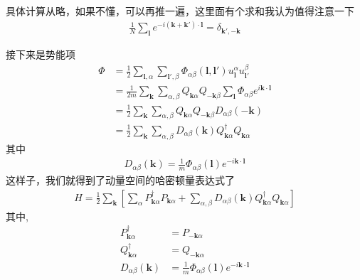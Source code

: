 具体计算从略，如果不懂，可以再推一遍，这里面有个求和我认为值得注意一下
\begin{equation}
    \begin{aligned} 
    \frac{1}{N} \sum_\mathbf{l} e^{-i(\mathbf{k} + \mathbf{k'})\cdot \mathbf{l}} = \delta_{\mathbf{k',-k} } 
    \end{aligned} 
\end{equation}
\par 接下来是势能项
\begin{equation}
    \begin{aligned} 
    \Phi &= \frac{1}{2} \sum_{\mathbf{l},\alpha }\sum_{\mathbf{l'},\beta}\Phi_{\alpha \beta} 
    (\mathbf{l,l'} )u_\mathbf{l}^\alpha u_\mathbf{l'}^\beta \\
    &= \frac{1}{2m} \sum_\mathbf{k}\sum_{\alpha,\beta} Q_{\mathbf{k}\alpha }Q_{\mathbf{-k}\beta }
    \sum_{\mathbf{l} }\Phi_{\alpha \beta} e^{i \mathbf{k\cdot l} }\\
    &= \frac{1}{2} \sum_\mathbf{k}\sum_{\alpha,\beta} Q_{\mathbf{k}\alpha }Q_{\mathbf{-k}\beta }
    D_{\alpha \beta} (-\mathbf{k} ) \\
    &= \frac{1}{2}\sum_\mathbf{k}\sum_{\alpha,\beta} D_{\alpha \beta} (\mathbf{k} ) Q_{\mathbf{k}\alpha }^\dagger
    Q_{\mathbf{k}\alpha }
    \end{aligned} 
\end{equation}
其中 
\begin{equation}
    \begin{aligned} 
        D_{\alpha \beta} (\mathbf{k} ) = \frac{1}{m}\Phi_{\alpha \beta} (\mathbf{l} )e^{-i \mathbf{k\cdot l} }
    \end{aligned} 
\end{equation}
这样子，我们就得到了动量空间的哈密顿量表达式了
\begin{equation}
    \begin{aligned} 
    H = \frac{1}{2}\sum_\mathbf{k}\left[\sum_\alpha  P_{\mathbf{k}\alpha }^\dagger P_{\mathbf{k}\alpha } +  \sum_{\alpha,\beta} D_{\alpha \beta} (\mathbf{k} ) Q_{\mathbf{k}\alpha }^\dagger
    Q_{\mathbf{k}\alpha }\right] 
    \end{aligned} 
\end{equation}
其中,
\begin{equation}
    \begin{aligned} 
        P_{\mathbf{k}\alpha }^\dagger  &= P_{\mathbf{-k}\alpha } \\
        Q_{\mathbf{k}\alpha }^\dagger  &= Q_{-\mathbf{k}\alpha } \\
        D_{\alpha \beta} (\mathbf{k} ) &= \frac{1}{m}\Phi_{\alpha \beta} (\mathbf{l} )e^{-i \mathbf{k\cdot l} }
    \end{aligned} 
\end{equation}
